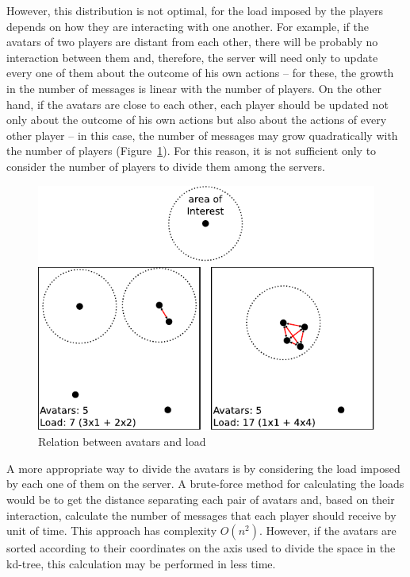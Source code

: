 \documentclass[acmjacm]{acmtrans2m}
\begin{document}
However, this distribution is not optimal, for the load imposed by the players depends on how they are interacting with one another. For example, if the avatars of two players are distant from each other, there will be probably no interaction between them and, therefore, the server will need only to update every one of them about the outcome of his own actions -- for these, the growth in the number of messages is linear with the number of players. On the other hand, if the avatars are close to each other, each player should be updated not only about the outcome of his own actions but also about the actions of every other player -- in this case, the number of messages may grow quadratically with the number of players \mbox{(Figure \ref{fig:load})}. For this reason, it is not sufficient only to consider the number of players to divide them among the servers.

\begin{figure}
  \centering
  \includegraphics[width=0.8\linewidth]{images/carga}
  \caption{Relation between avatars and load}
  \label{fig:load}
\end{figure}

A more appropriate way to divide the avatars is by considering the load imposed by each one of them on the server. A brute-force method for calculating the loads would be to get the distance separating each pair of avatars and, based on their interaction, calculate the number of messages that each player should receive by unit of time. This approach has complexity $O(n^2)$. However, if the avatars are sorted according to their coordinates on the axis used to divide the space in the kd-tree, this calculation may be performed in less time.
\end{document}
